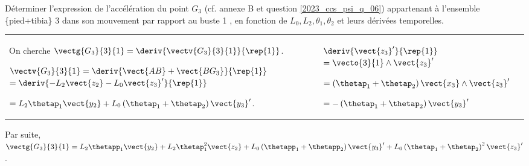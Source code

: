 \begin{question}
\label{2023_ccs_psi_q_07}
Déterminer l'expression de l'accélération du point $G_{3}$ (cf. annexe B et question \ref{2023_ccs_psi_q_06}) appartenant à l'ensemble \{pied+tibia\} 3 dans son mouvement par rapport au buste 1 , en fonction de $L_{0}, L_{2}, \theta_{1}, \theta_{2}$ et leurs dérivées temporelles.\\
\end{question}
\ifprof
\begin{corrige}
\begin{tabular}{p{.68\linewidth}| p{.3\linewidth}}
On cherche $\vectg{G_3}{3}{1} = \deriv{\vectv{G_3}{3}{1}}{\rep{1}}$.

$\vectv{G_3}{3}{1} = \deriv{\vect{AB}+\vect{BG_3}}{\rep{1}}$
$= \deriv{-L_2 \vect{z_2} -L_0 \vect{z_3}'}{\rep{1}}$

$=L_2 \thetap_1\vect{y_2}  +L_0  \left(\thetap_1 + \thetap_2 \right)\vect{y_3}'$.
&
$\deriv{\vect{z_3}'}{\rep{1}} $ $=\vecto{3}{1}\wedge \vect{z_3}' $

$= \left(\thetap_1 + \thetap_2 \right)\vect{x_3} \wedge \vect{z_3}' $

$= - \left(\thetap_1 + \thetap_2 \right)\vect{y_3}' $ 
\\
\end{tabular}

Par suite, 
$\vectg{G_3}{3}{1} = L_2 \thetapp_1\vect{y_2}  +L_2 \thetap_1^2\vect{z_2}  + L_0  \left(\thetapp_1 + \thetapp_2 \right)\vect{y_3}'+ L_0  \left(\thetap_1 + \thetap_2 \right)^2\vect{z_3}'$.

\end{corrige}
\else
\fi


